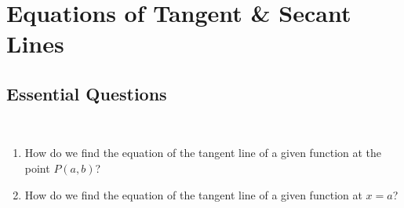 \documentclass[20150903-160354-rs2.2-MarksMathNotebook.tex]{subfiles}
\begin{document}
%
%

\chapter{Equations of Tangent \& Secant Lines}


\section{Essential Questions}\label{Essential Questions}

\begin{essentialq}\hfill \\

\begin{enumerate}
	\item How do we find the equation of the tangent line of a given function at the point $P(a,b)$?
	\item How do we find the equation of the tangent line of a given function at $x=a$?
\end{enumerate}

\end{essentialq}

\end{document}

